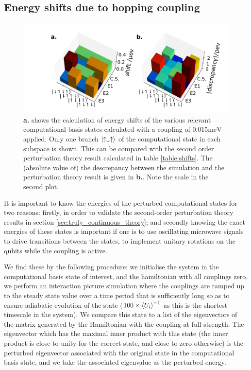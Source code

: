 \documentclass{report}
\begin{document}
\subsection{Energy shifts due to hopping coupling}

\begin{figure}[h]
    \centering
    \includegraphics[scale = 0.4]{Figures/shifts.pdf}
    \caption{\textbf{a.} shows the calculation of energy shifts of the various relevant computational basis states calculated with a coupling of $0.015\unit{\milli\electronvolt}$ applied. Only one branch $\ket{\uparrow\downarrow\uparrow}$ of the computational state in each subspace is shown. This can be compared with the second order perturbation theory result calculated in table \ref{table:shifts}. The (absolute value of) the descrepancy between the simulation and the perturbation theory result is given in \textbf{b.}. Note the scale in the second plot.
    \label{fig:shifts}}
\end{figure}
It is important to know the energies of the perturbed computational states for two reasons: firstly, in order to validate the second-order perturbation theory results in section \ref{sec:truly_continuous_theory}; and secondly knowing the exact energies of these states is important if one is to use oscillating microwave signals to drive transitions between the states, to implement unitary rotations on the qubits while the coupling is active.

We find these by the following procedure: we initialise the system in the computational basis state of interest, and the hamiltonian with all couplings zero. we perform an interaction picture simulation where the couplings are ramped up to the steady state value over a time period that is sufficiently long so as to ensure adiabatic evolution of the state ($100\times\braket{U_i}^{-1}$ as this is the shortest timescale in the system). We compare this state to a list of the eigenvectors of the matrix generated by the Hamiltonian with the coupling at full strength. The eigenvector which has the maximal inner product with this state (the inner product is close to unity for the correct state, and close to zero otherwise) is the perturbed eigenvector associated with the original state in the computational basis state, and we take the associated eigenvalue as the perturbed energy.
\end{document}
